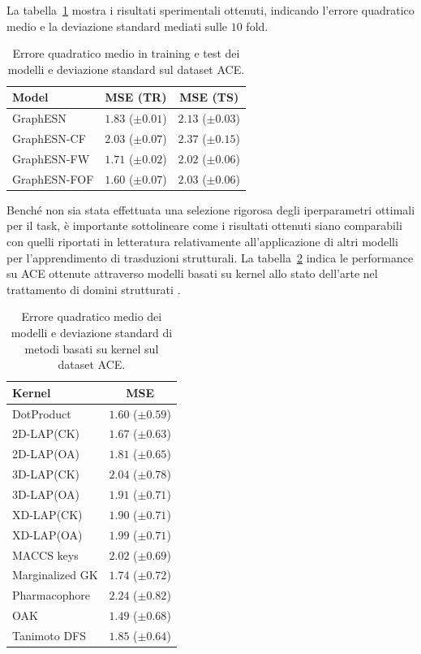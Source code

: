 La tabella~\ref{tab:esperimenti:ACE} mostra i risultati sperimentali ottenuti, indicando l'errore quadratico medio e la deviazione standard mediati sulle $10$ fold.
\begin{table}[tb]
\small
\caption[Accuratezza media su ACE]{Errore quadratico medio in training e test dei modelli e deviazione standard sul dataset ACE.}
\label{tab:esperimenti:ACE}
\centering
\begin{tabular}{l*{2}{c}}
\toprule
Model & MSE (TR) & MSE (TS) \\
\midrule
GraphESN    & $1.83$ ($\pm 0.01$) &	$2.13$ ($\pm 0.03$) \\ 
GraphESN-CF & $2.03$ ($\pm 0.07$) & $2.37$ ($\pm 0.15$) \\
GraphESN-FW & $1.71$ ($\pm 0.02$) & $2.02$ ($\pm 0.06$) \\
GraphESN-FOF & $1.60$ ($\pm 0.07$) & $2.03$ ($\pm 0.06$) \\
\bottomrule
\end{tabular}
\end{table}
%
Benché non sia stata effettuata una selezione rigorosa degli iperparametri ottimali per il task, è importante sottolineare come i risultati ottenuti siano comparabili con quelli riportati in letteratura relativamente all'applicazione di altri modelli per l'apprendimento di trasduzioni strutturali.
La tabella~\ref{tab:esperimenti:kernelACE} indica le performance su ACE ottenute attraverso modelli basati su kernel allo stato dell'arte nel trattamento di domini strutturati \cite{Hinselmann:GraphKernels}.
\begin{table}[tbp]
\small
\caption[Performance di metodi kernel-based su ACE]{Errore quadratico medio dei modelli e deviazione standard di metodi basati su kernel sul dataset ACE.}
\label{tab:esperimenti:kernelACE}
\centering
\begin{tabular}{lc}
\toprule
Kernel 	& MSE \\
\midrule
DotProduct & $1.60$ ($\pm 0.59$) \\
2D-LAP(CK) & $1.67$ ($\pm 0.63$) \\
2D-LAP(OA) & $1.81$ ($\pm 0.65$) \\
3D-LAP(CK) & $2.04$ ($\pm 0.78$) \\
3D-LAP(OA) & $1.91$ ($\pm 0.71$) \\
XD-LAP(CK) & $1.90$ ($\pm 0.71$) \\
XD-LAP(OA) & $1.99$ ($\pm 0.71$) \\
MACCS keys & $2.02$ ($\pm 0.69$) \\
Marginalized GK & $1.74$ ($\pm 0.72$) \\
Pharmacophore & $2.24$ ($\pm 0.82$) \\
OAK & $1.49$ ($\pm 0.68$) \\
Tanimoto DFS & $1.85$ ($\pm 0.64$) \\
\bottomrule
\end{tabular}
\end{table}

